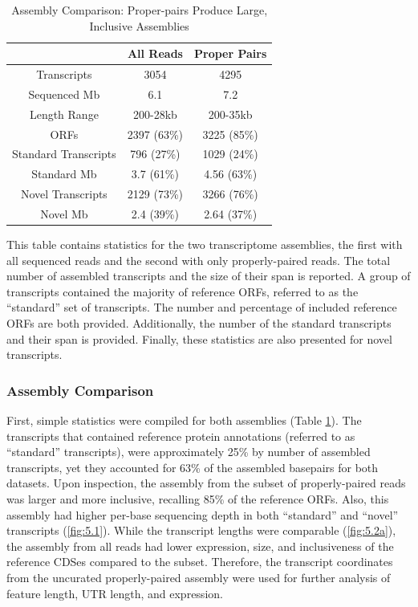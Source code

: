 \begin{table}
\begin{center}
\begin{tabular}{|c|c|c|}\hline
  & All Reads & Proper Pairs\\\hline\hline
Transcripts & 3054 & 4295\\\hline
Sequenced Mb & 6.1 & 7.2\\\hline
Length Range & 200-28kb & 200-35kb\\\hline
ORFs & 2397 (63\%) & 3225 (85\%)\\\hline
Standard Transcripts & 796 (27\%) & 1029 (24\%)\\\hline
Standard Mb & 3.7 (61\%) & 4.56 (63\%)\\\hline
Novel Transcripts & 2129 (73\%) & 3266 (76\%)\\\hline
Novel Mb & 2.4 (39\%)& 2.64 (37\%)\\\hline
\end{tabular}
\end{center}
\caption{Assembly Comparison: Proper-pairs Produce Large, Inclusive Assemblies}\label{table:assemb_compare}
\small
This table contains statistics for the two transcriptome assemblies, the first with all sequenced reads and the second with only properly-paired reads. The total number of assembled transcripts and the size of their span is reported. A group of transcripts contained the majority of reference ORFs, referred to as the ``standard'' set of transcripts. The number and percentage of included reference ORFs are both provided. Additionally, the number of the standard transcripts and their span is provided. Finally, these statistics are also presented for novel transcripts.
\end{table}

\subsubsection{Assembly Comparison}
First, simple statistics were compiled for both assemblies (Table \ref{table:assemb_compare}). The transcripts that contained reference protein annotations (referred to as ``standard'' transcripts), were approximately 25\% by number of assembled transcripts, yet they accounted for 63\% of the assembled basepairs for both datasets. Upon inspection, the assembly from the subset of properly-paired reads was larger and more inclusive, recalling 85\% of the reference ORFs. Also, this assembly had higher per-base sequencing depth in both ``standard'' and ``novel'' transcripts (\ref{fig:5.1}). While the transcript lengths were comparable (\ref{fig:5.2a}), the assembly from all reads had lower expression, size, and inclusiveness of the reference CDSes compared to the subset. Therefore, the transcript coordinates from the uncurated properly-paired assembly were used for further analysis of feature length, UTR length, and expression.




